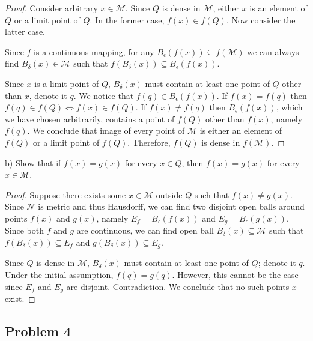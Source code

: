 \documentclass{article}
\begin{document}
\begin{proof}

Consider arbitrary $x \in \mathcal{M}$.
Since $Q$ is dense in $\mathcal{M}$, either $x$ is an element of $Q$ or a limit point of $Q$.
In the former case, $f(x) \in f(Q)$. Now consider the latter case.

Since $f$ is a continuous mapping, for any $B_{\epsilon}(f(x)) \subseteq f(\mathcal{M})$ we can always find $B_{\delta}(x) \in \mathcal{M}$ such that $f (B_{\delta}(x)) \subseteq B_{\epsilon}(f(x))$.

Since $x$ is a limit point of $Q$, $B_{\delta}(x)$ must contain at least one point of $Q$ other than $x$, denote it $q$.
We notice that $f(q) \in B_{\epsilon}(f(x))$.
If $f(x) = f(q)$ then $f(q) \in f(Q) \iff f(x) \in f(Q)$.
If $f(x) \neq f(q)$ then $B_{\epsilon}(f(x))$, which we have chosen arbitrarily, contains a point of $f(Q)$ other than $f(x)$, namely $f(q)$.
We conclude that image of every point of $\mathcal{M}$ is either an element of $f(Q)$ or a limit point of $f(Q)$.
Therefore, $f(Q)$ is dense in $f(\mathcal{M})$. 

\end{proof}

\begin{tcolorbox}
b) Show that if $f (x) = g (x)$ for every $x \in Q$, then $f (x) = g (x)$ for every $x \in \mathcal{M}$.
\end{tcolorbox}

\begin{proof}

Suppose there exists some $x \in \mathcal{M}$ outside $Q$ such that $f(x) \neq g(x)$.
Since $\mathcal{N}$ is metric and thus Hausdorff, we can find two disjoint open balls around points $f(x)$ and $g(x)$, namely $E_f = B_{\epsilon}(f(x))$ and $E_g = B_{\epsilon}(g(x))$.
Since both $f$ and $g$ are continuous, we can find open ball $B_{\delta}(x) \subseteq \mathcal{M}$ such that $f (B_{\delta}(x)) \subseteq E_f$ and $g (B_{\delta}(x)) \subseteq E_g$.

Since $Q$ is dense in $\mathcal{M}$, $B_{\delta}(x)$ must contain at least one point of $Q$; denote it $q$.
Under the initial assumption, $f(q)=g(q)$.
However, this cannot be the case since $E_f$ and $E_g$ are disjoint.
Contradiction.
We conclude that no such points $x$ exist.

\end{proof}


\subsection*{Problem 4}
\end{document}
